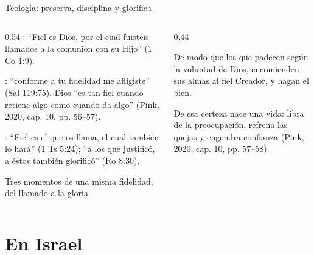 \begin{frame}{Teología: preserva, disciplina y glorifica}
\begin{columns}[t,onlytextwidth]
\begin{column}{0.54\textwidth}\small
{}: ``Fiel es Dios, por el cual fuisteis llamados a la comunión con su Hijo'' (1 Co 1:9).\par\smallskip
{}: ``conforme a tu fidelidad me afligiste'' (Sal 119:75). Dios ``es tan fiel cuando retiene algo como cuando da algo'' (Pink, 2020, cap. 10, pp. 56--57).\par\smallskip
{}: ``Fiel es el que os llama, el cual también lo hará'' (1 Ts 5:24); ``a los que justificó, a éstos también glorificó'' (Ro 8:30).\par\medskip
Tres momentos de una misma fidelidad, del llamado a la gloria.
\end{column}
\begin{column}{0.44\textwidth}
\begin{cita}De modo que los que padecen según la voluntad de Dios, encomienden sus almas al fiel Creador, y hagan el bien.\end{cita}
\scriptsize De esa certeza nace una vida: libra de la preocupación, refrena las quejas y engendra confianza (Pink, 2020, cap. 10, pp. 57--58).
\end{column}
\end{columns}
\end{frame}

\section{En Israel}

